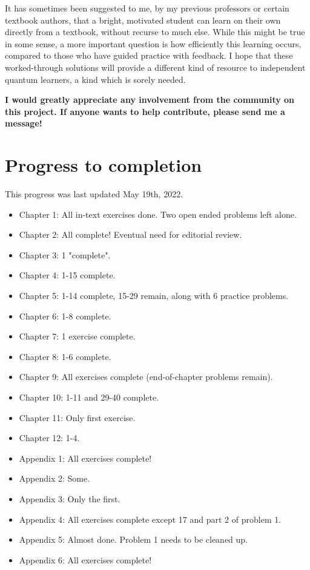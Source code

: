\documentclass{book}
\begin{document}
It has sometimes been suggested to me, by my previous professors or certain textbook authors, that a bright, motivated student can learn on their own directly from a textbook, without recurse to much else. While this might be true in some sense, a more important question is how efficiently this learning occurs, compared to those who have guided practice with feedback. I hope that these worked-through solutions will provide a different kind of resource to independent quantum learners, a kind which is sorely needed.

\textbf{I would greatly appreciate any involvement from the community on this project. If anyone wants to help contribute, please send me a message!}

\section{Progress to completion}

This progress was last updated May 19th, 2022.

\begin{itemize}
    \item Chapter 1: All in-text exercises done. Two open ended problems left alone.
    \item Chapter 2: All complete! Eventual need for editorial review.
    \item Chapter 3: 1 "complete".
    \item Chapter 4: 1-15 complete.
    \item Chapter 5: 1-14 complete, 15-29 remain, along with 6 practice problems.
    \item Chapter 6: 1-8 complete.
    \item Chapter 7: 1 exercise complete.
    \item Chapter 8: 1-6 complete.
    \item Chapter 9: All exercises complete (end-of-chapter problems remain).
    \item Chapter 10: 1-11 and 29-40 complete.
    \item Chapter 11: Only first exercise.
    \item Chapter 12: 1-4.
    \item Appendix 1: All exercises complete!
    \item Appendix 2: Some.
    \item Appendix 3: Only the first.
    \item Appendix 4: All exercises complete except 17 and part 2 of problem 1.
    \item Appendix 5: Almost done. Problem 1 needs to be cleaned up. 
    \item Appendix 6: All exercises complete!
\end{itemize}
\end{document}
